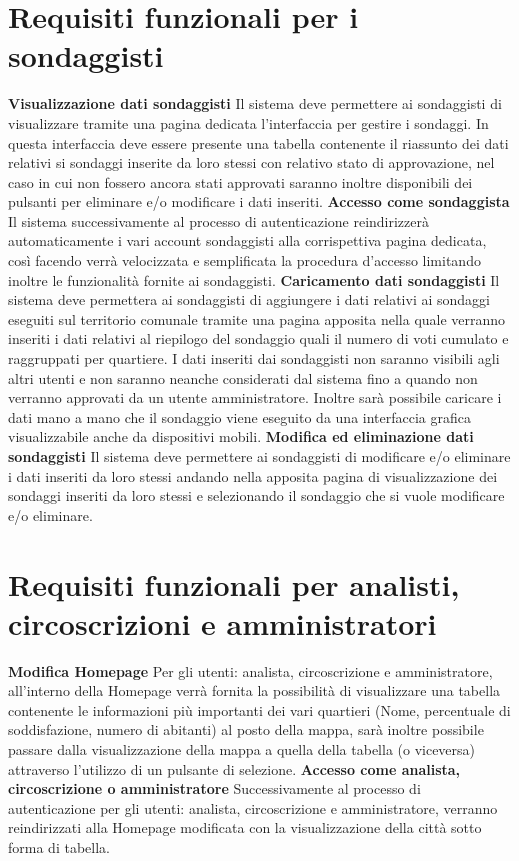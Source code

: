     \section{Requisiti funzionali per i sondaggisti}
        \begin{rfList}
            \rfItem \textbf{Visualizzazione dati sondaggisti} Il sistema deve permettere ai sondaggisti di visualizzare tramite una pagina dedicata l'interfaccia per gestire i sondaggi. In questa interfaccia deve essere presente una tabella contenente il riassunto dei dati relativi si sondaggi inserite da loro stessi con relativo stato di approvazione, nel caso in cui non fossero ancora stati approvati saranno inoltre disponibili dei pulsanti per eliminare e/o modificare i dati inseriti.
            \rfItem \textbf{Accesso come sondaggista} Il sistema successivamente al processo di autenticazione reindirizzerà automaticamente i vari account sondaggisti alla corrispettiva pagina dedicata, così facendo verrà velocizzata e semplificata la procedura d'accesso limitando inoltre le funzionalità fornite ai sondaggisti.
            \rfItem \textbf{Caricamento dati sondaggisti} Il sistema deve permettera ai sondaggisti di aggiungere i dati relativi ai sondaggi eseguiti sul territorio comunale tramite una pagina apposita nella quale verranno inseriti i dati relativi al riepilogo del sondaggio quali il numero di voti cumulato e raggruppati per quartiere. I dati inseriti dai sondaggisti non saranno visibili agli altri utenti e non saranno neanche considerati dal sistema fino a quando non verranno approvati da un utente amministratore. Inoltre sarà possibile caricare i dati mano a mano che il sondaggio viene eseguito da una interfaccia grafica visualizzabile anche da dispositivi mobili.
            \rfItem \textbf{Modifica ed eliminazione dati sondaggisti} Il sistema deve permettere ai sondaggisti di modificare e/o eliminare i dati inseriti da loro stessi andando nella apposita pagina di visualizzazione dei sondaggi inseriti da loro stessi e selezionando il sondaggio che si vuole modificare e/o eliminare. 
        \end{rfList}
    \section{Requisiti funzionali per analisti, circoscrizioni e amministratori}
        \begin{rfList}
            \rfItem \textbf{Modifica Homepage} Per gli utenti: analista, circoscrizione e amministratore, all'interno della Homepage verrà fornita la possibilità di visualizzare una tabella contenente le informazioni più importanti dei vari quartieri (Nome, percentuale di soddisfazione, numero di abitanti) al posto della mappa, sarà inoltre possibile passare dalla visualizzazione della mappa a quella della tabella (o viceversa) attraverso l'utilizzo di un pulsante di selezione.
            \rfItem \textbf{Accesso come analista, circoscrizione o amministratore} Successivamente al processo di autenticazione per gli utenti: analista, circoscrizione e amministratore, verranno reindirizzati alla Homepage modificata con la visualizzazione della città sotto forma di tabella.
        \end{rfList}

